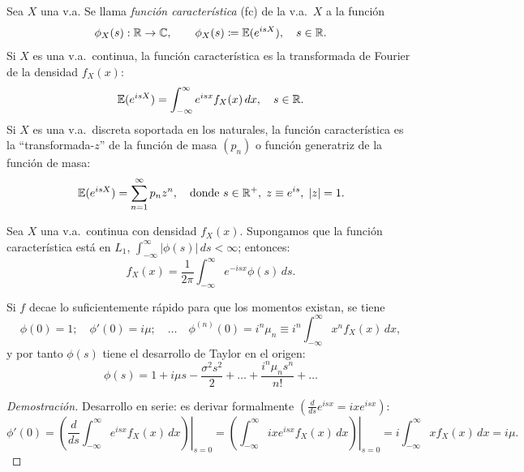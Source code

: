 \begin{definicion}[26]
Sea $X$ una v.a. Se llama \emph{función característica} (fc) de la v.a.\ $X$ a la función
\begin{equation*}
  \phi_X(s) : \mathbb{R} \to \mathbb{C}, \qquad \phi_X(s) \coloneqq \mathbb{E}(e^{isX}), \quad s \in \mathbb{R}.
\end{equation*}
Si $X$ es una v.a.\ continua, la función característica es la transformada de Fourier de la densidad $f_X(x)$:
\begin{equation*}
  \mathbb{E}(e^{isX}) = \int_{-\infty}^\infty e^{isx} f_X(x)\,dx, \quad s \in \mathbb{R}.
\end{equation*}
Si $X$ es una v.a.\ discreta soportada en los naturales, la función característica es la ``transformada-$z$'' de la función de masa $(p_n)$ o función generatriz de la función de masa:
\begin{equation*}
  \mathbb{E}(e^{isX}) = \sum_{n=1}^\infty p_n z^n, \quad \text{donde } s \in \mathbb{R}^+, \; z \equiv e^{is}, \; |z| = 1.
\end{equation*}
\end{definicion}

\begin{teorema}
Sea $X$ una v.a.\ continua con densidad $f_X(x)$. Supongamos que la función característica está en $L_1$, $\int_{-\infty}^\infty |\phi(s)|\,ds < \infty$; entonces:
\[
  f_X(x) = \frac{1}{2\pi} \int_{-\infty}^\infty e^{-isx} \phi(s)\,ds.
\]
\end{teorema}

\begin{teorema}[8]
Si $f$ decae lo suficientemente rápido para que los momentos existan, se tiene
\[
  \phi(0) = 1; \quad \phi'(0) = i\mu; \quad \dots \quad \phi^{(n)}(0) = i^n \mu_n \equiv i^n \int_{-\infty}^\infty x^n f_X(x)\,dx,
\]
y por tanto $\phi(s)$ tiene el desarrollo de Taylor en el origen:
\[
  \phi(s) = 1 + i\mu s - \frac{\sigma^2 s^2}{2} + \dots + \frac{i^n \mu_n s^n}{n!} + \dots
\]
\end{teorema}

\begin{proof}[Demostración]
Desarrollo en serie: es derivar formalmente $\left(\frac{d}{ds} e^{isx} = ix e^{isx}\right)$:
\begin{equation*}
  \phi'(0) = \left.\left(\frac{d}{ds} \int_{-\infty}^\infty e^{isx} f_X(x)\,dx\right)\right|_{s=0} = \left.\left(\int_{-\infty}^\infty ix e^{isx} f_X(x)\,dx\right)\right|_{s=0} = i\int_{-\infty}^\infty x f_X(x)\,dx = i\mu.
\end{equation*}
\end{proof}

